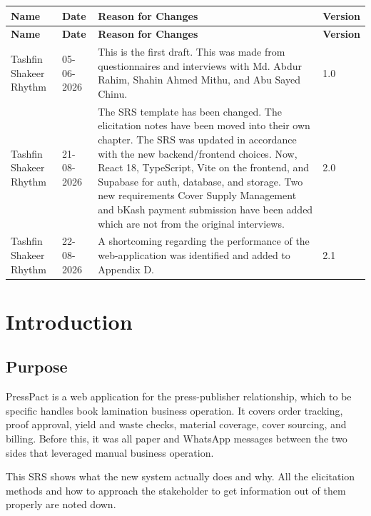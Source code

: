 \documentclass{scrreprt}
\begin{document}
\begin{longtable}{L{0.18\textwidth} L{0.12\textwidth} L{0.60\textwidth} L{0.10\textwidth}}
\toprule
{} \textbf{Name} & \textbf{Date} & \textbf{Reason for Changes} & \textbf{Version} \\
\midrule
\endfirsthead
\toprule
{} \textbf{Name} & \textbf{Date} & \textbf{Reason for Changes} & \textbf{Version} \\
\midrule
\endhead
Tashfin Shakeer Rhythm & 05-06-2026 & This is the first draft. This was made from questionnaires and interviews with Md. Abdur Rahim, Shahin Ahmed Mithu, and Abu Sayed Chinu. & 1.0 \\
Tashfin Shakeer Rhythm & 21-08-2026 & The SRS template has been changed. The elicitation notes have been moved into their own chapter. The SRS was updated in accordance with the new backend/frontend choices. Now, React 18, TypeScript, Vite on the frontend, and Supabase for auth, database, and storage. Two new requirements Cover Supply Management and bKash payment submission have been added which are not from the original interviews. & 2.0 \\
Tashfin Shakeer Rhythm & 22-08-2026 & A shortcoming regarding the performance of the web-application was identified and added to Appendix D. & 2.1 \\
\bottomrule
\end{longtable}

\chapter{Introduction}

\section{Purpose}
PressPact is a web application for the press-publisher relationship, which to be specific handles book lamination business operation. It covers order tracking, proof approval, yield and waste checks, material coverage, cover sourcing, and billing. Before this, it was all paper and WhatsApp messages between the two sides that leveraged manual business operation.

This SRS shows what the new system actually does and why. All the elicitation methods and how to approach the stakeholder to get information out of them properly are noted down.
\end{document}
